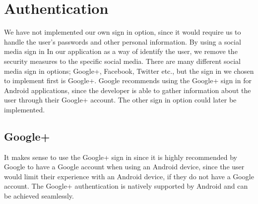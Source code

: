 \section{Authentication}
We have not implemented our own sign in option, since it would require us to handle the user's passwords and other personal information.
By using a social media sign in In our application as a way of identify the user, we remove the security measures to the specific social media.
There are many different social media sign in options; Google+, Facebook, Twitter etc., but the sign in we chosen to implement first is Google+. 
Google recommends using the Google+ sign in for Android applications, since the developer is able to gather information about the user through their Google+ account. The other sign in option could later be implemented.

\subsection{Google+}
It makes sense to use the Google+ sign in since it is highly recommended by Google to have a Google account when using an Android device, since the user would limit their experience with an Android device, if they do not have a Google account. The Google+ authentication is natively supported by Android and can be achieved seamlessly. 


